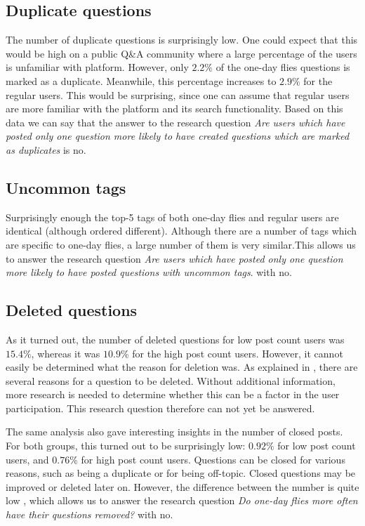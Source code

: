 \documentclass[conference]{IEEEtran}
\begin{document}
\subsection{Duplicate questions}

The number of duplicate questions is surprisingly low. One could expect that this would be high on a public Q\&A community where a large percentage of the users is unfamiliar with platform. However, only $2.2\%$ of the one-day flies questions is marked as a duplicate. Meanwhile, this percentage increases to $2.9\%$ for the regular users. This would be surprising, since one can assume that regular users are more familiar with the platform and its search functionality. Based on this data we can say that the answer to the research question \textit{Are users which have posted only one question more likely to have created questions which are marked as duplicates} is no.

\subsection{Uncommon tags}

Surprisingly enough the top-5 tags of both one-day flies and regular users are identical (although ordered different). Although there are a number of tags which are specific to one-day flies, a large number of them is very similar.This allows us to answer the research question \textit{Are users which have posted only one question more likely to have posted questions with uncommon tags}. with no.

\subsection{Deleted questions}
As it turned out, the number of deleted questions for low post count users was $15.4\%$, whereas it was $10.9\%$ for the high post count users. However, it cannot easily be determined what the reason for deletion was. As explained in \cite{correa2014chaff}, there are several reasons for a question to be deleted. Without additional information, more research is needed to determine whether this can be a factor in the user participation. This research question therefore can not yet be answered.

The same analysis also gave interesting insights in the number of closed posts. For both groups, this turned out to be surprisingly low: $0.92\%$ for low post count users, and $0.76\%$ for high post count users. Questions can be closed for various reasons, such as being a duplicate or for being off-topic. Closed questions may be improved or deleted later on. However, the difference between the number is quite low , which allows us to answer the research question \textit{Do one-day flies more often have their questions removed?} with no.
\end{document}

